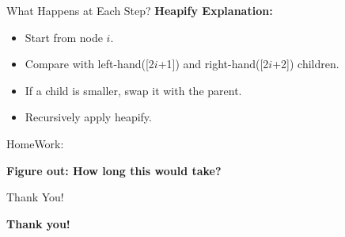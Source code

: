 \begin{frame}{What Happens at Each Step?}
\textbf{Heapify Explanation:}
\begin{itemize}
\item Start from node $i$.
\item Compare with left-hand([2$i$+1]) and right-hand([2$i$+2]) children.
\item If a child is smaller, swap it with the parent.
\item Recursively apply heapify.
\end{itemize}
\end{frame}

\begin{frame}{HomeWork:}
\begin{center}
    \textbf{Figure out: How long this would take?}
\end{center}
\end{frame}

\begin{frame}{Thank You!}
\begin{center}
    \textbf{Thank you!}
\end{center}
\end{frame}